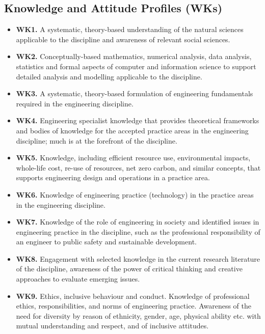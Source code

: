 \begin{center}
  \section*{Knowledge and Attitude Profiles (WKs)}
\end{center}
\justify
\begin{itemize}[label={}]
  \item \textbf{WK1.} A systematic, theory-based understanding of the natural sciences applicable to the discipline and awareness of relevant social sciences.
  \item \textbf{WK2.} Conceptually-based mathematics, numerical analysis, data analysis, statistics and formal aspects of computer and information science to support detailed analysis and modelling applicable to the discipline.
  \item \textbf{WK3.} A systematic, theory-based formulation of engineering fundamentals required in the engineering discipline.
  \item \textbf{WK4.} Engineering specialist knowledge that provides theoretical frameworks and bodies of knowledge for the accepted practice areas in the engineering discipline; much is at the forefront of the discipline.
  \item \textbf{WK5.} Knowledge, including efficient resource use, environmental impacts, whole-life cost, re-use of resources, net zero carbon, and similar concepts, that supports engineering design and operations in a practice area.
  \item \textbf{WK6.} Knowledge of engineering practice (technology) in the practice areas in the engineering discipline.
  \item \textbf{WK7.} Knowledge of the role of engineering in society and identified issues in engineering practice in the discipline, such as the professional responsibility of an engineer to public safety and sustainable development.
  \item \textbf{WK8.} Engagement with selected knowledge in the current research literature of the discipline, awareness of the power of critical thinking and creative approaches to evaluate emerging issues.
  \item \textbf{WK9.} Ethics, inclusive behaviour and conduct. Knowledge of professional ethics, responsibilities, and norms of engineering practice. Awareness of the need for diversity by reason of ethnicity, gender, age, physical ability etc. with mutual understanding and respect, and of inclusive attitudes.
\end{itemize}
